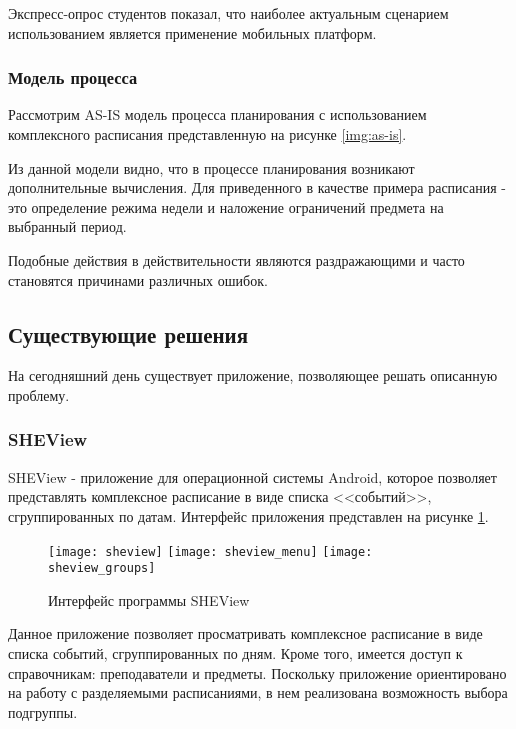 Экспресс-опрос студентов показал, что наиболее актуальным сценарием использованием является применение мобильных платформ.

\subsubsection{Модель процесса}

Рассмотрим AS-IS модель процесса планирования с использованием комплексного расписания представленную на рисунке \ref{img:as-is}.


Из данной модели видно, что в процессе планирования возникают дополнительные вычисления.
Для приведенного в качестве примера расписания - это определение режима недели и наложение ограничений предмета на выбранный период.

Подобные действия в действительности являются раздражающими и часто становятся причинами различных ошибок.

\subsection{Существующие решения}

На сегодняшний день существует приложение, позволяющее решать описанную проблему.

\subsubsection{SHEView}

SHEView - приложение для операционной системы Android, которое позволяет представлять комплексное расписание в виде списка <<событий>>, сгруппированных по датам.
Интерфейс приложения представлен на рисунке \ref{img:sheview}.

\begin{figure}[H]
      \texttt{[image: sheview]}
  \endminipage\hfill
      \texttt{[image: sheview\_menu]}
  \endminipage\hfill
      \texttt{[image: sheview\_groups]}
  \endminipage
  \caption{Интерфейс программы SHEView} \label{img:sheview}
\end{figure}

Данное приложение позволяет просматривать комплексное расписание в виде списка событий, сгруппированных по дням.
Кроме того, имеется доступ к справочникам: преподаватели и предметы.
Поскольку приложение ориентировано на работу с разделяемыми расписаниями, в нем реализована возможность выбора подгруппы.

